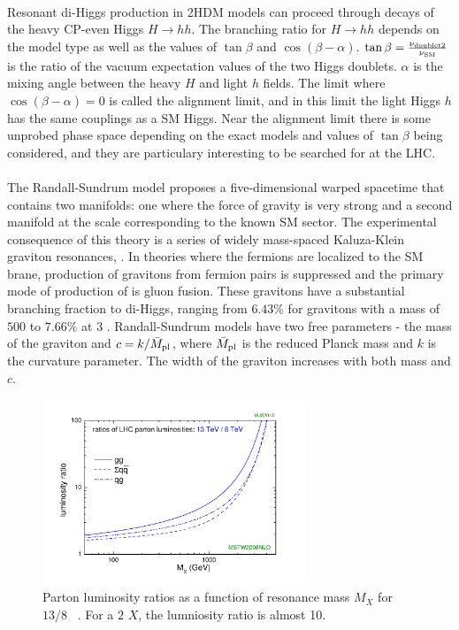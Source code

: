 \paragraph{}
Resonant di-Higgs production in 2HDM models can proceed through decays of the heavy CP-even Higgs $H\to hh$. The branching ratio for $H\to hh$ depends on the model type as well as the values of $\tan{\beta}$ and $\cos(\beta - \alpha)$. $\tan{\beta} = \frac{\rm \nu_{\rm doublet2}}{\rm \nu_{SM}}$ is the ratio of the vacuum expectation values of the two Higgs doublets. $\alpha$ is the mixing angle between the heavy $H$ and light $h$ fields. The limit where $\cos(\beta - \alpha) = 0$ is called the alignment limit, and in this limit the light Higgs $h$ has the same couplings as a SM Higgs. Near the alignment limit there is some unprobed phase space depending on the exact models and values of $\tan{\beta}$ being considered, and they are particulary interesting to be searched for at the LHC.

\paragraph{}
The Randall-Sundrum model proposes a five-dimensional warped spacetime that contains two manifolds: one where the force of gravity is very strong and a second manifold at the \TeV scale corresponding to the known SM sector. The experimental consequence of this theory is a series of widely mass-spaced Kaluza-Klein graviton resonances, \Grav. In theories where the fermions are localized to the SM brane, production of gravitons from fermion pairs is suppressed and the primary mode of production of \Grav is gluon fusion. These gravitons have a substantial branching fraction to di-Higgs, ranging from $6.43$\% for gravitons with a mass of $500$ \GeV to $7.66\%$ at $3$ \TeV. Randall-Sundrum models have two free parameters - the mass of the graviton and $c = k/\bar{M}_{\rm pl}$, where $\bar{M}_{\rm pl}$ is the reduced Planck mass and $k$ is the curvature parameter. The width of the graviton increases with both mass and $c$.

\begin{figure}[h!]
  \centering
  \captionsetup{justification=centering}
  \includegraphics[width=0.7\textwidth,angle=270]{figures/theory/lhclumi7813_2013_v1.pdf}
  \caption{Parton luminosity ratios as a function of resonance mass $M_{X}$ for $13/8$ \TeV~\cite{LumiRatio}. For a $2$ \TeV $X$, the lumniosity ratio is almost 10.}
  \label{fig:lumi_ratio}
\end{figure}

